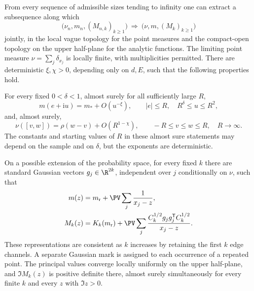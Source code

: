 \begin{proposition}\label{prop:microscopic-limit}
From every sequence of admissible sizes tending to infinity one can
extract a subsequence along which
\[
 \bigl(\nu_n,m_n,(M_{n,k})_{k\ge1}\bigr)
 \ \Longrightarrow\
 \bigl(\nu,m,(M_k)_{k\ge1}\bigr)
\]
jointly, in the local vague topology for the point measures and the
compact-open topology on the upper half-plane for the analytic
functions. The limiting point measure \(\nu=\sum_j\delta_{x_j}\) is
locally finite, with multiplicities permitted. There are deterministic
\(\xi,\chi>0\), depending only on \(d,E\), such that the following
properties hold.

For every fixed \(0<\delta<1\), almost surely for all sufficiently
large \(R\),
\begin{equation}\label{eq:mesoscopic-limit}
 m(e+\mathrm i u)=m_*+O(u^{-\xi}),
 \qquad |e|\le R,\quad R^\delta\le u\le R^2,
\end{equation}
and, almost surely,
\begin{equation}\label{eq:discrepancy}
 \nu([v,w])=\rho(w-v)+O(R^{1-\chi}),
 \qquad -R\le v\le w\le R,\quad R\longrightarrow\infty.
\end{equation}
The constants and starting values of \(R\) in these almost sure
statements may depend on the sample and on \(\delta\), but the exponents
are deterministic.

On a possible extension of the probability space, for every fixed
\(k\) there are standard Gaussian vectors \(g_j\in\R^{2k}\), independent
over \(j\) conditionally on \(\nu\), such that
\begin{equation}\label{eq:marked-representation}
 \begin{split}
  m(z)&=m_{\rm r}+\PV\sum_j\frac1{x_j-z},\\
  M_k(z)&=K_k(m_{\rm r})
       +\PV\sum_j
       \frac{C_k^{1/2}g_jg_j^{\mathsf T}C_k^{1/2}}{x_j-z}.
 \end{split}
\end{equation}
These representations are consistent as \(k\) increases by retaining
the first \(k\) edge channels. A separate Gaussian mark is assigned to
each occurrence of a repeated point. The principal values converge
locally uniformly on the upper half-plane, and
\(\Im M_k(z)\) is positive definite there, almost surely simultaneously
for every finite \(k\) and every \(z\) with \(\Im z>0\).
\end{proposition}

